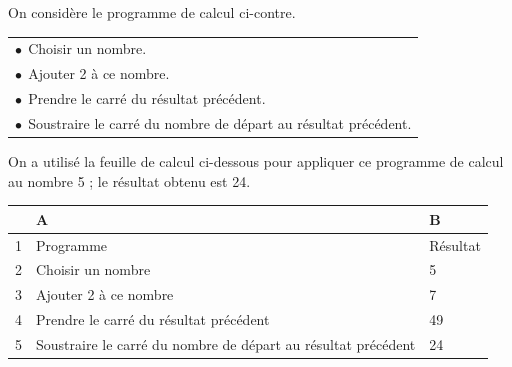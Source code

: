 \documentclass[exercice,a4]{thedocument}%
\begin{document}
%

\medskip

\parbox{0.48\linewidth}{On considère le programme de calcul ci-contre.}\hfill
\parbox{0.48\linewidth}{\begin{tabularx}{\linewidth}{|X|}\hline
$\bullet~~$Choisir un nombre.\\
$\bullet~~$Ajouter 2 à ce nombre.\\
$\bullet~~$Prendre le carré du résultat précédent.\\
$\bullet~~$Soustraire le carré du nombre de départ au résultat précédent.\\ \hline
\end{tabularx}}

\medskip

On a utilisé la feuille de calcul ci-dessous pour appliquer ce programme de calcul au nombre 5 ; le résultat obtenu est 24.

\begin{center}
\begin{tabularx}{\linewidth}{|c|l|X|}\hline
&A&B\\ \hline
1& Programme&Résultat\\ \hline
2& Choisir un nombre &5\\ \hline
3& Ajouter 2 à ce nombre &7\\ \hline
4& Prendre le carré du résultat précédent &49\\ \hline
5& Soustraire le carré du nombre de départ au résultat précédent &24\\ \hline
\end{tabularx}
\end{center}

\smallskip
\end{document}
